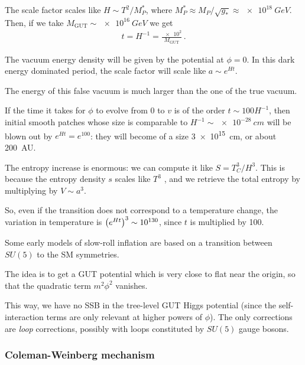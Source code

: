 \documentclass[main.tex]{subfiles}
\begin{document}
The scale factor scales like \(H \sim T^2 / M_P^{*}\), where \(M_P^{*} \approx M_P / \sqrt{g_{*}} \approx \SI{e18}{GeV}\). 
Then, if we take \(M _{\text{GUT}} \sim \SI{e16}{GeV}\) we get 
%
\begin{align}
t = H^{-1} = \frac{\num{e2}}{M _{\text{GUT}}}
\,.
\end{align}

The vacuum energy density will be given by the potential at \(\phi  = 0\). In this dark energy dominated period, the scale factor will scale like \(a \sim e^{Ht}\).

The energy of this false vacuum is much larger than the one of the true vacuum. 

If the time it takes for \(\phi \) to evolve from 0 to \(v\) is of the order \(t \sim 100 H^{-1}\), then initial smooth patches whose size is comparable to \(H^{-1} \sim \SI{e-28}{cm}\) will be blown out by \(e^{H t} = e^{100}\): they will become of a size \SI{3e15}{cm}, or about \SI{200}{AU}.

The entropy increase is enormous: we can compute it like \(S = T_C^3 / H^3\). 
This is because the entropy density \(s\) scales like \(T^3\) \cite[eq.\ 8.46]{bergstromCosmologyParticleAstrophysics2003}, and we retrieve the total entropy by multiplying by \(V \sim a^{3}\). 


So, even if the transition does not correspond to a temperature change, the variation in temperature is \(\qty( e^{Ht})^3 \sim \num{e130}\), since \(t\) is multiplied by 100.

Some early models of slow-roll inflation are based on a transition between \(SU(5)\) to the SM symmetries.

The idea is to get a GUT potential which is very close to flat near the origin, so that the quadratic term \(m^2\phi^2\) vanishes. 

This way, we have no SSB in the tree-level GUT Higgs potential (since the self-interaction terms are only relevant at higher powers of \(\phi  \)).
The only corrections are \emph{loop} corrections, possibly with loops constituted by \(SU(5) \) gauge bosons. 

\subsubsection{Coleman-Weinberg mechanism}
\end{document}
